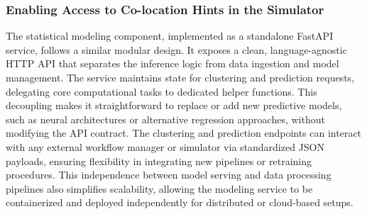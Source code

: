 
\begingroup
\small
{}
\endgroup
\subsubsection{Enabling Access to Co-location Hints in the Simulator}
\label{sec:statistical_modeling}
The statistical modeling component, implemented as a standalone FastAPI service, follows a similar modular design. It exposes a clean, language-agnostic HTTP API that separates the inference logic from data ingestion and model management. The service maintains state for clustering and prediction requests, delegating core computational tasks to dedicated helper functions. This decoupling makes it straightforward to replace or add new predictive models, such as neural architectures or alternative regression approaches, without modifying the API contract. The clustering and prediction endpoints can interact with any external workflow manager or simulator via standardized JSON payloads, ensuring flexibility in integrating new pipelines or retraining procedures. This independence between model serving and data processing pipelines also simplifies scalability, allowing the modeling service to be containerized and deployed independently for distributed or cloud-based setups.


